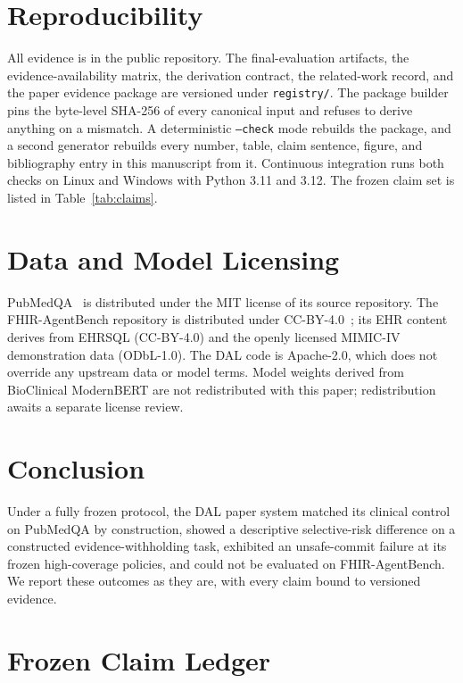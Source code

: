 \documentclass[11pt]{article}
\begin{document}
\section{Reproducibility}

All evidence is in the public repository. The final-evaluation artifacts, the evidence-availability
matrix, the derivation contract, the related-work record, and the paper evidence package are versioned
under \texttt{registry/}. The package builder pins the byte-level SHA-256 of every canonical input and
refuses to derive anything on a mismatch. A deterministic \texttt{--check} mode rebuilds the package, and
a second generator rebuilds every number, table, claim sentence, figure, and bibliography entry in this
manuscript from it. Continuous integration runs both checks on Linux and Windows with Python 3.11 and
3.12. The frozen claim set is listed in Table~\ref{tab:claims}.

\section{Data and Model Licensing}

PubMedQA~\citep{jin2019pubmedqa} is distributed under the MIT license of its source repository. The
FHIR-AgentBench repository is distributed under CC-BY-4.0~\citep{fhiragentbench_repo}; its EHR content derives
from EHRSQL (CC-BY-4.0) and the openly licensed MIMIC-IV demonstration data (ODbL-1.0). The DAL code is
Apache-2.0, which does not override any upstream data or model terms. Model weights derived from BioClinical ModernBERT are not redistributed with
this paper; redistribution awaits a separate license review.

\section{Conclusion}

Under a fully frozen protocol, the DAL paper system matched its clinical control on PubMedQA by
construction, showed a descriptive selective-risk difference on a constructed evidence-withholding task,
exhibited an unsafe-commit failure at its frozen high-coverage policies, and could not be evaluated on
FHIR-AgentBench. We report these outcomes as they are, with every claim bound to versioned evidence.




\appendix

\section{Frozen Claim Ledger}
\label{app:claims}
\end{document}

